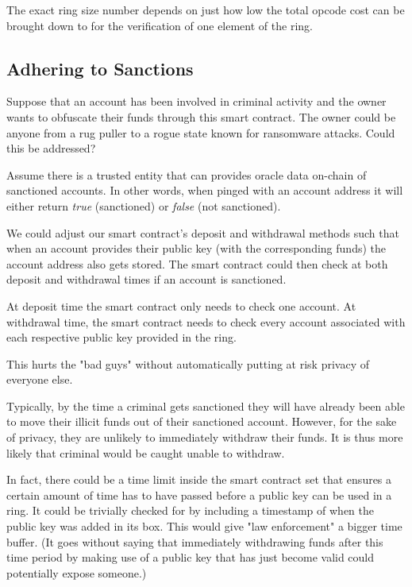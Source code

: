 \documentclass[9pt]{article}
\begin{document}
The exact ring size number depends on just how low the total opcode cost can be brought down to for the verification of one element of the ring.

\subsection{Adhering to Sanctions} \label{subsection:sanctions}

Suppose that an account has been involved in criminal activity and the owner wants to obfuscate their funds through this smart contract. The owner could be anyone from a rug puller to a rogue state known for ransomware attacks. Could this be addressed?

Assume there is a trusted entity that can provides oracle data on-chain of sanctioned accounts. In other words, when pinged with an account address it will either return \textit{true} (sanctioned) or \textit{false} (not sanctioned).

We could adjust our smart contract's deposit and withdrawal methods such that when an account provides their public key (with the corresponding funds) the account address also gets stored. The smart contract could then check at both deposit and withdrawal times if an account is sanctioned. 

At deposit time the smart contract only needs to check one account. At withdrawal time, the smart contract needs to check every account associated with each respective public key provided in the ring.

This hurts the "bad guys" without automatically putting at risk privacy of everyone else.

Typically, by the time a criminal gets sanctioned they will have already been able to move their illicit funds out of their sanctioned account. However, for the sake of privacy, they are unlikely to immediately withdraw their funds. It is thus more likely that criminal would be caught unable to withdraw.

In fact, there could be a time limit inside the smart contract set that ensures a certain amount of time has to have passed before a public key can be used in a ring. It could be trivially checked for by including a timestamp of when the public key was added in its box. This would give "law enforcement" a bigger time buffer. (It goes without saying that immediately withdrawing funds after this time period by making use of a public key that has just become valid could potentially expose someone.)
\end{document}
